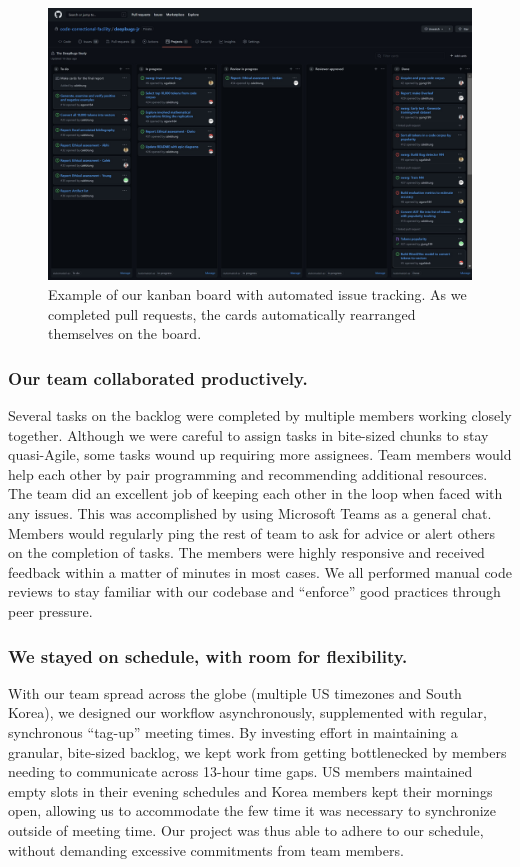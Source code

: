 \begin{figure}[h]
    \centering
    \includegraphics[width=\linewidth]{images/GitHub Projects.jpg}
    \caption{Example of our kanban board with automated issue tracking. As we completed pull requests, the cards automatically rearranged themselves on the board.}
    \label{fig:github-projects}
\end{figure}

\subsubsection{\textbf{Our team collaborated productively.}} Several tasks on the backlog were completed by multiple members working closely together. Although we were careful to assign tasks in bite-sized chunks to stay quasi-Agile, some tasks wound up requiring more assignees. Team members would help each other by pair programming and recommending additional resources. The team did an excellent job of keeping each other in the loop when faced with any issues. This was accomplished by using Microsoft Teams as a general chat. Members would regularly ping the rest of team to ask for advice or alert others on the completion of tasks. The members were highly responsive and received feedback within a matter of minutes in most cases. We all performed manual code reviews to stay familiar with our codebase and ``enforce'' good practices through peer pressure.

\subsubsection{\textbf{We stayed on schedule, with room for flexibility.}} With our team spread across the globe (multiple US timezones and South Korea), we designed our workflow asynchronously, supplemented with regular, synchronous ``tag-up'' meeting times. By investing effort in maintaining a granular, bite-sized backlog, we kept work from getting bottlenecked by members needing to communicate across 13-hour time gaps. US members maintained empty slots in their evening schedules and Korea members kept their mornings open, allowing us to accommodate the few time it was necessary to synchronize outside of meeting time. Our project was thus able to adhere to our schedule, without demanding excessive commitments from team members.

